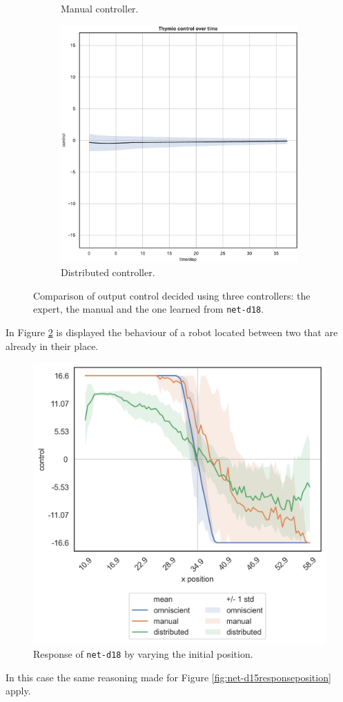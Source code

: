 \begin{figure}[!htb]
\begin{subfigure}[h]{0.3\textwidth}
		\caption{Manual controller.}
	\end{subfigure}
	\hfill
	\begin{subfigure}[h]{0.3\textwidth}
		\centering
		\includegraphics[width=\textwidth]{contents/images/net-d18/control-overtime-learned_distributed}
		\caption{Distributed controller.}
	\end{subfigure}
	\caption[Evaluation of the control decided by \texttt{net-d18}.]{Comparison 
		of output control decided using three controllers: the expert, the manual and 
		the one learned from \texttt{net-d18}.}
	\label{fig:net-d18control}
\end{figure}


In Figure \ref{fig:net-d18responseposition} is displayed the behaviour of a robot 
located between two that are already in their place.
\begin{figure}[!htb]
	\centering
	\includegraphics[width=.45\textwidth]{contents/images/net-d18/response-varying_init_position-distributed}%
	\caption{Response of \texttt{net-d18} by varying the initial position.}
	\label{fig:net-d18responseposition}
\end{figure}
In this case the same reasoning made for Figure 
\ref{fig:net-d15responseposition} apply.

